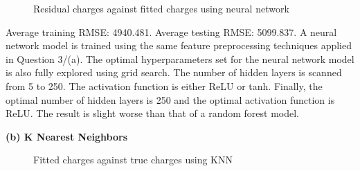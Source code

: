 \documentclass{article}
\begin{document}
\begin{figure}[!htbp]
\centering
{}
\caption{Residual charges against fitted charges using neural network} \label{3_4_b_Neural_2}
\end{figure}

Average training RMSE: 4940.481.\newline
\indent Average testing RMSE: 5099.837.\newline
\indent A neural network model is trained using the same feature preprocessing techniques applied in Question 3/(a). The optimal hyperparameters set for the neural network model is also fully explored using grid search. The number of hidden layers is scanned from 5 to 250. The activation function is either ReLU or tanh. Finally, the optimal number of hidden layers is 250 and the optimal activation function is ReLU. The result is slight worse than that of a random forest model.\bigbreak

\noindent \textbf{(b) K Nearest Neighbors} \bigbreak

\begin{figure}[!htbp]
\centering
{}
\caption{Fitted charges against true charges using KNN} \label{3_4_b_KNN_1}
\end{figure}
\end{document}
